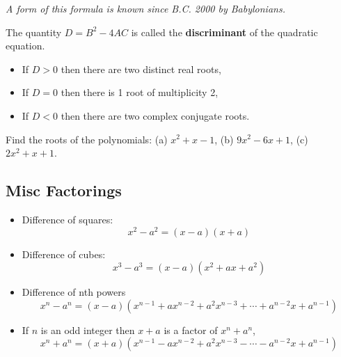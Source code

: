 \documentclass[../main.tex]{subfiles}
\begin{document}
\textit{A form of this formula is known since B.C. 2000 by Babylonians.}

The quantity $D=B^2 - 4AC$ is called the \textbf{discriminant} of the quadratic equation.

\begin{itemize}
  \item If $D>0$ then there are two distinct real roots,
  \item If $D=0$ then there is 1 root of multiplicity 2,
  \item If $D<0$ then there are two complex conjugate roots.
\end{itemize}

\begin{example}
  Find the roots of the polynomials: (a) $x^2+x-1$, (b) $9x^2 -6x+1$, (c) $2x^2+x+1$.
\end{example}

\subsection*{Misc Factorings}

\begin{itemize}
  \item Difference of squares:
  \[
    x^2 - a^2 = (x-a)(x+a)
  \]
  \item Difference of cubes:
  \[
    x^3 - a^3 = (x-a)(x^2+ax+a^2)
  \]
  \item Difference of nth powers
  \[
    x^n - a^n = (x-a)(x^{n-1}+ a x^{n-2} + a^2 x^{n-3} + \cdots + a^{n-2}x + a^{n-1})
  \]
  \item If $n$ is an odd integer then $x+a$ is a factor of $x^n+a^n$,
  \[
    x^n + a^n = (x+a)(x^{n-1} - a x^{n-2} + a^2 x^{n-3} - \cdots - a^{n-2}x + a^{n-1})
  \]
\end{itemize}
\end{document}
